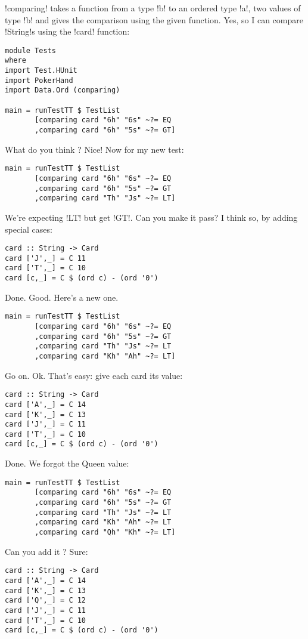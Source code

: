 \il!comparing! takes a function from a type \il!b! to an ordered type \il!a!, two values of type \il!b! and gives the comparison using the given function.
\lhN Yes, so I can compare \il!String!s using the \il!card! function:
\begin{lstlisting}[frame=single]
module Tests
where 
import Test.HUnit
import PokerHand
import Data.Ord (comparing)

main = runTestTT $ TestList 
       [comparing card "6h" "6s" ~?= EQ
       ,comparing card "6h" "5s" ~?= GT]
\end{lstlisting} %
\success What do you think ?
\lhA \success Nice!
\lhN Now for my new test:
\begin{lstlisting}[frame=single]
main = runTestTT $ TestList 
       [comparing card "6h" "6s" ~?= EQ
       ,comparing card "6h" "5s" ~?= GT
       ,comparing card "Th" "Js" ~?= LT]
\end{lstlisting} %
\failure We're expecting \il!LT! but get \il!GT!. Can you make it pass?
\lhA
\failure I think so, by adding special cases:
\begin{lstlisting}[frame=single]
card :: String -> Card
card ['J',_] = C 11
card ['T',_] = C 10
card [c,_] = C $ (ord c) - (ord '0')
\end{lstlisting} %
\success Done.
\lhN Good. Here's a new one.
\begin{lstlisting}[frame=single]
main = runTestTT $ TestList 
       [comparing card "6h" "6s" ~?= EQ
       ,comparing card "6h" "5s" ~?= GT
       ,comparing card "Th" "Js" ~?= LT
       ,comparing card "Kh" "Ah" ~?= LT]
\end{lstlisting} %
\failure Go on.
\lhA \failure Ok. That's easy: give each card its value:
\begin{lstlisting}[frame=single]
card :: String -> Card
card ['A',_] = C 14
card ['K',_] = C 13
card ['J',_] = C 11
card ['T',_] = C 10
card [c,_] = C $ (ord c) - (ord '0')
\end{lstlisting} %
\success Done.
\lhN We forgot the Queen value:
\begin{lstlisting}[frame=single]
main = runTestTT $ TestList 
       [comparing card "6h" "6s" ~?= EQ
       ,comparing card "6h" "5s" ~?= GT
       ,comparing card "Th" "Js" ~?= LT
       ,comparing card "Kh" "Ah" ~?= LT
       ,comparing card "Qh" "Kh" ~?= LT]
\end{lstlisting} %
Can you add it ?
\lhA \failure Sure:
\begin{lstlisting}[frame=single]
card :: String -> Card
card ['A',_] = C 14
card ['K',_] = C 13
card ['Q',_] = C 12
card ['J',_] = C 11
card ['T',_] = C 10
card [c,_] = C $ (ord c) - (ord '0')
\end{lstlisting} %
